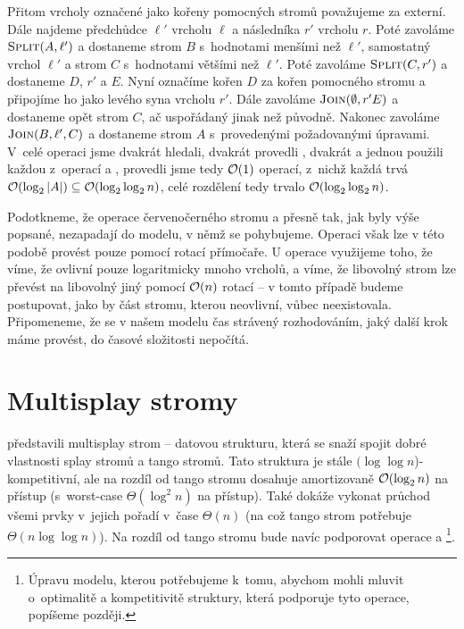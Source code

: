 Přitom vrcholy označené jako kořeny pomocných stromů považujeme za externí.
Dále najdeme předchůdce $\ell'$ vrcholu $\ell$ a následníka $r'$ vrcholu $r$. Poté zavoláme
$\ope{Split}(A, \ell')$ a dostaneme strom $B$ s~hodnotami menšími než $\ell'$,
samostatný vrchol $\ell'$ a strom $C$ s~hodnotami většími než $\ell'$. Poté
zavoláme $\ope{Split}(C,r')$ a dostaneme $D$, $r'$ a $E$. Nyní označíme kořen
$D$ za kořen pomocného stromu a připojíme ho jako levého syna vrcholu $r'$.
Dále zavoláme $\ope{Join}(\emptyset, r' E)$ a dostaneme opět strom $C$, ač
uspořádaný jinak než původně. Nakonec zavoláme $\ope{Join}(B,\ell',C)$ a
dostaneme strom $A$ s~provedenými požadovanými úpravami. V~celé operaci jsme
dvakrát hledali, dvakrát provedli , dvakrát  a jednou
použili každou z~operací  a , provedli jsme tedy $\mathcal O(1)$ operací, z~nichž každá trvá
$\o(\log |A|)\subseteq \o(\log\log n)$, celé rozdělení tedy trvalo
$\o(\log\log n)$.

Podotkneme, že operace červenočerného stromu  a  přesně tak, jak byly výše popsané, nezapadají do modelu, v němž se pohybujeme. Operaci  však lze v této podobě provést pouze pomocí rotací přímočaře. U operace  využijeme  toho, že víme, že ovlivní pouze logaritmicky mnoho vrcholů, a víme, že libovolný strom lze převést na libovolný jiný pomocí $\mathcal O(n)$ rotací -- v tomto případě budeme postupovat, jako by část stromu, kterou  neovlivní, vůbec neexistovala. Připomeneme, že se v našem modelu čas strávený rozhodováním, jaký další krok máme provést, do časové složitosti nepočítá.

\section{Multisplay stromy}

\citet{multisplay} představili multisplay strom -- datovou strukturu, která se
snaží spojit dobré vlastnosti splay stromů a tango stromů. Tato struktura je
stále $(\log\log n$)-kompetitivní, ale na rozdíl od tango stromu dosahuje
amortizovaně $\o(\log n)$ na přístup (s~worst-case $\Theta(\log^2 n)$ na
přístup). Také dokáže vykonat průchod všemi prvky v~jejich pořadí v~čase
$\Theta(n)$ (na což tango strom potřebuje $\Theta(n\log\log n)$). Na rozdíl
od tango stromu bude navíc podporovat operace  a \footnote{Úpravu modelu,
kterou potřebujeme k~tomu, abychom mohli mluvit o~optimalitě a kompetitivitě
struktury, která podporuje tyto operace, popíšeme později.}.

